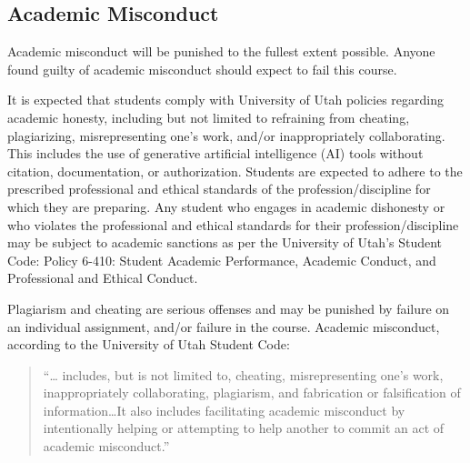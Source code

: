 \documentclass[
  letterpaper,
]{article}
\begin{document}
\subsection{Academic Misconduct}\label{academic-misconduct}

\begin{tcolorbox}[enhanced jigsaw, breakable, coltitle=black, opacityback=0, rightrule=.15mm, colframe=quarto-callout-warning-color-frame, bottomtitle=1mm, opacitybacktitle=0.6, bottomrule=.15mm, left=2mm, toptitle=1mm, titlerule=0mm, title=\textcolor{quarto-callout-warning-color}{\faExclamationTriangle}\hspace{0.5em}{Warning}, colback=white, arc=.35mm, toprule=.15mm, leftrule=.75mm, colbacktitle=quarto-callout-warning-color!10!white]

Academic misconduct will be punished to the fullest extent possible.
Anyone found guilty of academic misconduct should expect to fail this
course.

\end{tcolorbox}

It is expected that students comply with University of Utah policies
regarding academic honesty, including but not limited to refraining from
cheating, plagiarizing, misrepresenting one's work, and/or
inappropriately collaborating. This includes the use of generative
artificial intelligence (AI) tools without citation, documentation, or
authorization. Students are expected to adhere to the prescribed
professional and ethical standards of the profession/discipline for
which they are preparing. Any student who engages in academic dishonesty
or who violates the professional and ethical standards for their
profession/discipline may be subject to academic sanctions as per the
University of Utah's Student Code: Policy 6-410: Student Academic
Performance, Academic Conduct, and Professional and Ethical Conduct.

Plagiarism and cheating are serious offenses and may be punished by
failure on an individual assignment, and/or failure in the course.
Academic misconduct, according to the University of Utah Student Code:

\begin{quote}
``\ldots{} includes, but is not limited to, cheating, misrepresenting
one's work, inappropriately collaborating, plagiarism, and fabrication
or falsification of information\ldots It also includes facilitating
academic misconduct by intentionally helping or attempting to help
another to commit an act of academic misconduct.''
\end{quote}
\end{document}
